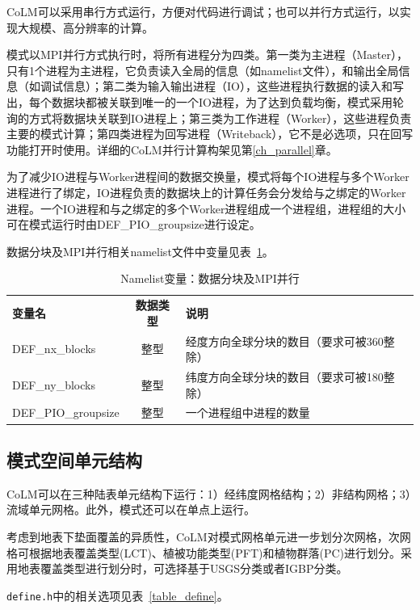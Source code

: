 \documentclass[a4paper,12pt,twoside]{article}
\begin{document}
CoLM可以采用串行方式运行，方便对代码进行调试；也可以并行方式运行，以实现大规模、高分辨率的计算。

模式以MPI并行方式执行时，将所有进程分为四类。第一类为主进程（Master），只有1个进程为主进程，它负责读入全局的信息（如namelist文件），和输出全局信息（如调试信息）；第二类为输入输出进程（IO），这些进程执行数据的读入和写出，每个数据块都被关联到唯一的一个IO进程，为了达到负载均衡，模式采用轮询的方式将数据块关联到IO进程上；第三类为工作进程（Worker），这些进程负责主要的模式计算；第四类进程为回写进程（Writeback），它不是必选项，只在回写功能打开时使用。详细的CoLM并行计算构架见第\ref{ch_parallel}章。

为了减少IO进程与Worker进程间的数据交换量，模式将每个IO进程与多个Worker进程进行了绑定，IO进程负责的数据块上的计算任务会分发给与之绑定的Worker进程。一个IO进程和与之绑定的多个Worker进程组成一个进程组，进程组的大小可在模式运行时由DEF\_PIO\_groupsize进行设定。

数据分块及MPI并行相关namelist文件中变量见表~\ref{table_nl_blocks_mpi}。

\begin{table}[!htbp] \small
\caption{Namelist变量：数据分块及MPI并行} \label{table_nl_blocks_mpi}
\centering \renewcommand{\arraystretch}{1.5}
\begin{tabular}{lcl}
\toprule
\textbf{变量名} & \textbf{数据类型} & \textbf{说明} \\
DEF\_nx\_blocks & 整型 & 经度方向全球分块的数目（要求可被360整除）\\
DEF\_ny\_blocks & 整型 & 纬度方向全球分块的数目（要求可被180整除）\\
DEF\_PIO\_groupsize & 整型 & 一个进程组中进程的数量 \\
\bottomrule
\end{tabular} 
\end{table}

\subsection{模式空间单元结构}

CoLM可以在三种陆表单元结构下运行：1）经纬度网格结构；2）非结构网格；3）流域单元网格。此外，模式还可以在单点上运行。

考虑到地表下垫面覆盖的异质性，CoLM对模式网格单元进一步划分次网格，次网格可根据地表覆盖类型(LCT)、植被功能类型(PFT)和植物群落(PC)进行划分。采用地表覆盖类型进行划分时，可选择基于USGS分类或者IGBP分类。

\texttt{define.h}中的相关选项见表~\ref{table_define}。
\end{document}
